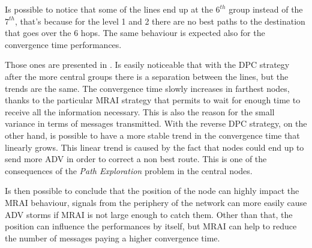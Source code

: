 Is possible to notice that some of the lines end up at the $6^{th}$ group instead
of the $7^{th}$, that's because for the level \num{1} and \num{2} there are
no best paths to the destination that goes over the \num{6} hops.
The same behaviour is expected also for the convergence time performances.

Those ones are presented in .
Is easily noticeable that with the \ac{DPC} strategy after the 
more central groups there is a separation between the lines, but the trends 
are the same.
The convergence time slowly increases in farthest nodes, thanks to the particular
\ac{MRAI} strategy that permits to wait for enough time to receive all the information
necessary.
This is also the reason for the small variance in terms of messages transmitted.
With the reverse \ac{DPC} strategy, on the other hand, is possible to have a 
more stable trend in the convergence time that linearly grows.
This linear trend is caused by the fact that nodes could end up to send more
\ac{ADV} in order to correct a non best route.
This is one of the consequences of the \textit{Path Exploration} problem in
the central nodes.

Is then possible to conclude that the position of the node can highly impact 
the \ac{MRAI} behaviour, signals from the periphery of the network can more
easily cause \ac{ADV} storms if \ac{MRAI} is not large enough to catch them.
Other than that, the position can influence the performances by itself, but
\ac{MRAI} can help to reduce the number of messages paying a higher convergence
time.

